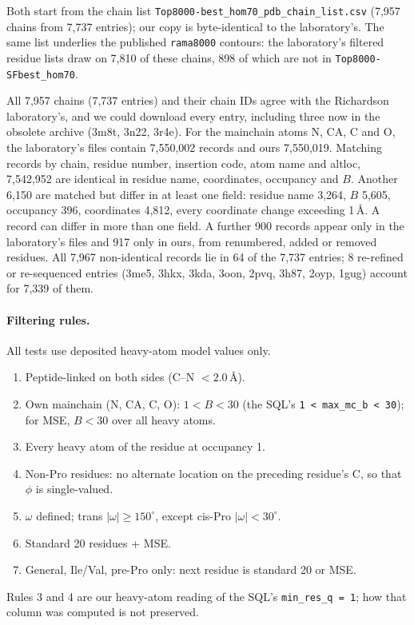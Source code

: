 \documentclass[11pt]{article}
\newcommand{\file}[1]{\texttt{#1}}
\begin{document}
Both start from the chain list \file{Top8000-best\_hom70\_pdb\_chain\_list.csv} \cite{referencedata}
(7,957 chains from 7,737 entries); our copy is byte-identical to the laboratory's. The same list
underlies the published \file{rama8000} contours: the laboratory's filtered residue lists draw on 7,810 of these
chains, 898 of which are not in \file{Top8000-SFbest\_hom70}.

All 7,957 chains (7,737 entries) and their chain IDs agree with the Richardson laboratory's, and we
could download every entry, including three now in the obsolete archive (3m8t, 3n22, 3r4e). For
the mainchain atoms N, CA, C and O, the laboratory's files contain 7,550,002 records and ours
7,550,019. Matching records by chain, residue number, insertion code, atom name and altloc,
7,542,952 are identical in residue name, coordinates, occupancy and $B$. Another 6,150 are
matched but differ in at least one field: residue name 3,264, $B$ 5,605, occupancy 396,
coordinates 4,812, every coordinate change exceeding 1\,\AA. A record can differ in more than one
field. A further 900 records appear only in the laboratory's files and 917 only in ours, from
renumbered, added or removed residues. All 7,967 non-identical records lie in 64 of the 7,737
entries; 8 re-refined or re-sequenced entries (3me5, 3hkx, 3kda, 3oon, 2pvq, 3h87, 2oyp, 1gug)
account for 7,339 of them.

\paragraph{Filtering rules.} All tests use deposited heavy-atom model values only.
\begin{enumerate}
  \item Peptide-linked on both sides (C--N $< 2.0$\,\AA).
  \item Own mainchain (N, CA, C, O): $1 < B < 30$ (the SQL's \file{1 < max\_mc\_b < 30}); for MSE,
    $B < 30$ over all heavy atoms.
  \item Every heavy atom of the residue at occupancy 1.
  \item Non-Pro residues: no alternate location on the preceding residue's C, so that $\phi$ is
    single-valued.
  \item $\omega$ defined; trans $|\omega| \ge 150^\circ$, except cis-Pro $|\omega| < 30^\circ$.
  \item Standard 20 residues + MSE.
  \item General, Ile/Val, pre-Pro only: next residue is standard 20 or MSE.
\end{enumerate}
Rules 3 and 4 are our heavy-atom reading of the SQL's \file{min\_res\_q = 1}; how that column was
computed is not preserved.
\end{document}
